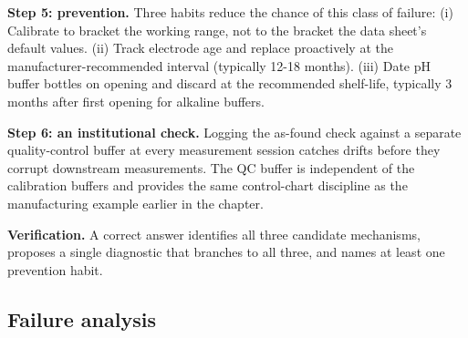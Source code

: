 \begin{exercise}
\textbf{Step 5: prevention.} Three habits reduce the chance of this
class of failure:
(i) Calibrate to bracket the working range, not to the bracket the
data sheet's default values. (ii) Track electrode age and replace
proactively at the manufacturer-recommended interval (typically
12-18 months). (iii) Date pH buffer bottles on opening and discard
at the recommended shelf-life, typically 3 months after first
opening for alkaline buffers.

\textbf{Step 6: an institutional check.} Logging the as-found check
against a separate quality-control buffer at every measurement
session catches drifts before they corrupt downstream measurements.
The QC buffer is independent of the calibration buffers and
provides the same control-chart discipline as the manufacturing
example earlier in the chapter.

\textbf{Verification.} A correct answer identifies all three
candidate mechanisms, proposes a single diagnostic that branches to
all three, and names at least one prevention habit.
\end{exercise}

\subsection*{Failure analysis}

